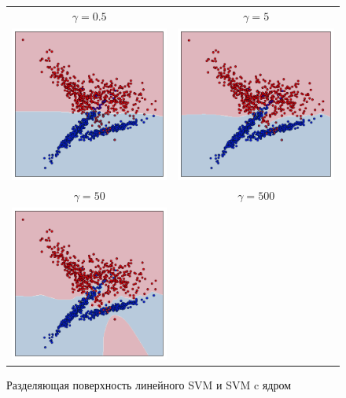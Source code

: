 \documentclass[12pt,fleqn,unicode]{article}
\begin{document}
\pagebreak
\begin{figure}[h!]
\centering
\caption{Разделяющая поверхность линейного SVM и SVM c ядром}
\label{fig6}
\begin{tabular}{cc}
	$\gamma=0.5$ & $\gamma=5$ \\
	\includegraphics[width=8cm]{../pict/nonsplit_rbf_0.5.pdf} &
	\includegraphics[width=8cm]{../pict/nonsplit_rbf_5.pdf}
	\\
	$\gamma=50$ & $\gamma=500$ \\ 
	\includegraphics[width=8cm]{../pict/nonsplit_rbf_50.pdf} &

\end{tabular}
\end{figure}
\end{document}
